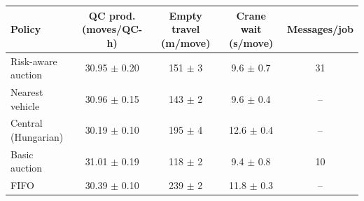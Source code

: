 \begin{tabular}{lcccc}
\toprule
Policy & QC prod. (moves/QC-h) & Empty travel (m/move) & Crane wait (s/move) & Messages/job \\
\midrule
Risk-aware auction & 30.95 $\pm$ 0.20 & 151 $\pm$ 3 & 9.6 $\pm$ 0.7 & 31 \\
Nearest vehicle & 30.96 $\pm$ 0.15 & 143 $\pm$ 2 & 9.6 $\pm$ 0.4 & -- \\
Central (Hungarian) & 30.19 $\pm$ 0.10 & 195 $\pm$ 4 & 12.6 $\pm$ 0.4 & -- \\
Basic auction & 31.01 $\pm$ 0.19 & 118 $\pm$ 2 & 9.4 $\pm$ 0.8 & 10 \\
FIFO & 30.39 $\pm$ 0.10 & 239 $\pm$ 2 & 11.8 $\pm$ 0.3 & -- \\
\bottomrule
\end{tabular}
